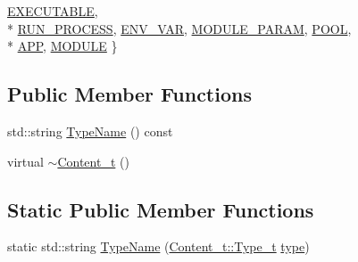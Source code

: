 \begin{DoxyCompactItemize}
\hyperlink{struct_content__t_a9ba94026278eb679d8d42d28725b0eaea93578f889fa81855b0c1efc413786a5e}{E\+X\+E\+C\+U\+T\+A\+B\+LE}, 
\\*
\hyperlink{struct_content__t_a9ba94026278eb679d8d42d28725b0eaea11a86f6579bdf24076096f02fb55c37e}{R\+U\+N\+\_\+\+P\+R\+O\+C\+E\+SS}, 
\hyperlink{struct_content__t_a9ba94026278eb679d8d42d28725b0eaea494e1512a24820e2f6a5f78a2ced81eb}{E\+N\+V\+\_\+\+V\+AR}, 
\hyperlink{struct_content__t_a9ba94026278eb679d8d42d28725b0eaeade332818a1a370e6b5386750933fdb23}{M\+O\+D\+U\+L\+E\+\_\+\+P\+A\+R\+AM}, 
\hyperlink{struct_content__t_a9ba94026278eb679d8d42d28725b0eaeab90054d27cb034696f60142106ad58d6}{P\+O\+OL}, 
\\*
\hyperlink{struct_content__t_a9ba94026278eb679d8d42d28725b0eaea59f4026d4e1498f9b29812ce55b854ed}{A\+PP}, 
\hyperlink{struct_content__t_a9ba94026278eb679d8d42d28725b0eaea9e68e8c8409b97e7ed78670434c9e3f3}{M\+O\+D\+U\+LE}
 \}
\end{DoxyCompactItemize}
\subsection*{Public Member Functions}
\begin{DoxyCompactItemize}
\item 
std\+::string \hyperlink{struct_content__t_a29aa14d0f1ed425df732827ef07a8a3a}{Type\+Name} () const 
\item 
virtual \hyperlink{struct_content__t_a784ceafae9bf38c50366757a69c11280}{$\sim$\+Content\+\_\+t} ()
\end{DoxyCompactItemize}
\subsection*{Static Public Member Functions}
\begin{DoxyCompactItemize}
\item 
static std\+::string \hyperlink{struct_content__t_a90f4a963fe5e54860fde719da349c7e1}{Type\+Name} (\hyperlink{struct_content__t_a9ba94026278eb679d8d42d28725b0eae}{Content\+\_\+t\+::\+Type\+\_\+t} \hyperlink{struct_content__t_a425ca8053dc9acd7555ea9fff664eb97}{type})
\end{DoxyCompactItemize}
